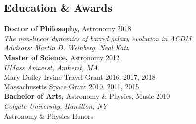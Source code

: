 \documentclass[margin, 12pt]{res} %
\begin{document}
\begin{resume}

 



\section{\sc Education \& Awards}

{\bf Doctor of Philosophy,} Astronomy \hfill 2018\\
\hspace*{0.25 in} {\sl The non-linear dynamics of barred galaxy evolution in $\Lambda$CDM}\\
\hspace*{0.25 in} {\sl Advisors: Martin D. Weinberg, Neal Katz}\\
{\bf Master of Science,} Astronomy \hfill 2012\\
\hspace*{0.25 in} {\sl UMass Amherst, Amherst, MA}\\
\hspace*{0.4 in} Mary Dailey Irvine Travel Grant \hfill 2016, 2017, 2018\\
\hspace*{0.4 in} Massachusetts Space Grant \hfill 2010, 2011, 2015\\
{\bf Bachelor of Arts,} Astronomy \& Physics, Music \hfill 2010\\
\hspace*{0.25 in} {\sl Colgate University, Hamilton, NY}\\
\hspace*{0.4 in} Astronomy \& Physics Honors

 


\end{resume}
\end{document}
